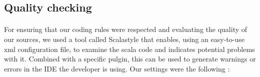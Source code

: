 \documentclass{report}
\begin{document}
\subsection{Quality checking}

\paragraph{}
\hspace{4mm}For ensuring that our coding rules were respected and
 evaluating the quality of our sources,
 we used a tool called Scalastyle that enables, using an easy-to-use xml configuration file,
 to examine the scala code and indicates potential problems with it.
 Combined with a specific pulgin, this can be used to generate 
warnings or errors in the IDE the developer is using. 
Our settings were the following :
\end{document}
